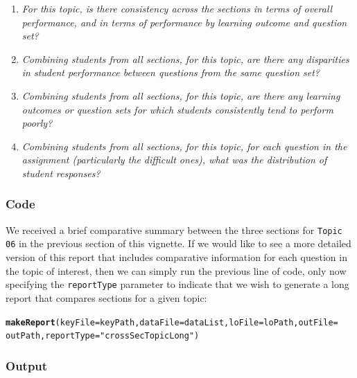 \documentclass{article}\usepackage[]{graphicx}\usepackage[]{color}
\makeatletter
\newcommand{\hlstr}[1]{\textcolor[rgb]{0.192,0.494,0.8}{#1}}%
\newcommand{\hlstd}[1]{\textcolor[rgb]{0.345,0.345,0.345}{#1}}%
\newcommand{\hlkwc}[1]{\textcolor[rgb]{0.333,0.667,0.333}{#1}}%
\newcommand{\hlkwd}[1]{\textcolor[rgb]{0.737,0.353,0.396}{\textbf{#1}}}%
\newenvironment{kframe}{%
 \def\at@end@of@kframe{}%
 \ifinner\ifhmode%
  \def\at@end@of@kframe{\end{minipage}}%
  \begin{minipage}{\columnwidth}%
 \fi\fi%
 \def\FrameCommand##1{\hskip\@totalleftmargin \hskip-\fboxsep
 \colorbox{shadecolor}{##1}\hskip-\fboxsep
     \hskip-\linewidth \hskip-\@totalleftmargin \hskip\columnwidth}%
 \MakeFramed {\advance\hsize-\width
   \@totalleftmargin\z@ \linewidth\hsize
   \@setminipage}}%
 {\par\unskip\endMakeFramed%
 \at@end@of@kframe}
\newenvironment{knitrout}{}{} %
\numberwithin{equation}{section} %
\makeatother
\begin{document}
\begin{enumerate}
\item \textit{For this topic, is there consistency across the sections in terms of overall performance, and in terms of performance by learning outcome and question set?}
\item \textit{Combining students from all sections, for this topic, are there any disparities in student performance between questions from the same question set?}
\item \textit{Combining students from all sections, for this topic, are there any learning outcomes or question sets for which students consistently tend to perform poorly?}
\item \textit{Combining students from all sections, for this topic, for each question in the assignment (particularly the difficult ones), what was the distribution of student responses?}
\end{enumerate}

\subsubsection{Code}

We received a brief comparative summary between the three sections for \texttt{Topic 06} in the previous section of this vignette. If we would like to see a more detailed version of this report that includes comparative information for each question in the topic of interest, then we can simply run the previous line of code, only now specifying the \texttt{reportType} parameter to indicate that we wish to generate a long report that compares sections for a given topic: \\

\begin{knitrout}
\color{fgcolor}\begin{kframe}
\begin{alltt}
\hlkwd{makeReport}\hlstd{(}\hlkwc{keyFile} \hlstd{= keyPath,} \hlkwc{dataFile} \hlstd{= dataList,} \hlkwc{loFile} \hlstd{= loPath,} \hlkwc{outFile} \hlstd{=}
  \hlstd{outPath,} \hlkwc{reportType} \hlstd{=} \hlstr{"crossSecTopicLong"}\hlstd{)}
\end{alltt}
\end{kframe}
\end{knitrout}

\subsubsection{Output}
\end{document}

